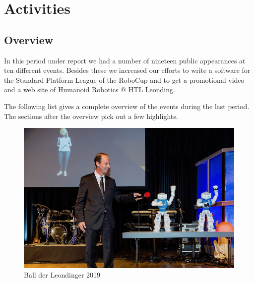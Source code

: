 \documentclass[11pt]{article}
\begin{document}
\section{Activities}
\subsection{Overview}
In this period under report we had a number of nineteen public appearances at ten different events. Besides these we increased our efforts to write a software for the Standard Platform League of the RoboCup and to get a promotional video and a web site of Humanoid Robotics @ HTL Leonding.

The following list gives a complete overview of the events during the last period. The sections after the overview pick out a few highlights.

\begin{figure}
\begin{center}
\includegraphics[scale=0.38]{img/ballDerLeondinger.png}
\end{center}
\caption{Ball der Leondinger 2019}
\label{fig:ballDerLeondinger}
\end{figure}
\end{document}
